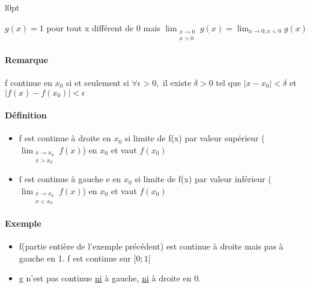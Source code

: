 \begin{wrapfigure}{l}{0pt}
\end{wrapfigure}
$g(x) = 1$ pour tout x différent de 0
mais $\lim_{\substack{x\to 0 \\  x > 0}} g(x) = \lim_{x \to 0; x <0} g(x) $

\paragraph{Remarque} f continue en $x_0$ si et seulement si $\forall \epsilon > 0,$ il existe $\delta >0$ tel que $|x-x_0| < \delta$ et $|f(x) - f(x_0)| < \epsilon$

\paragraph{Définition} \begin{itemize}
\item f est continue à droite en $x_0$ si limite de f(x) par valeur supérieur (\begin{math} \lim_{\substack{x \to x_0 \\ x > x_0}} f(x) \end{math}) en $x_0$ et vaut $f(x_0)$
\item f est continue à gauche e en $x_0$ si limite de f(x) par valeur inférieur (\begin{math} \lim_{\substack{x \to x_0 \\ x < x_0}} f(x) \end{math}) en $x_0$ et vaut $f(x_0)$
\end{itemize}

\paragraph{Exemple} \begin{itemize}
	\item f(partie entière de l'exemple précédent) est continue à droite mais pas à gauche en 1. f est continue sur $[0; 1[$
	\item g n'est pas continue \ul{ni} à gauche, \ul{ni} à droite en 0.
\end{itemize}

